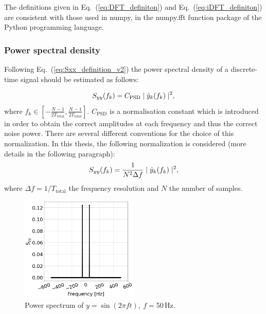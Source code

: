 The definitions given in Eq.~(\ref{eq:DFT_definiton}) and Eq.~(\ref{eq:iDFT_definiton}) are consistent with those used in numpy, in the numpy.fft function \cite{numpy_fft} package of the Python programming language. 

\subsubsection*{Power spectral density} %
Following Eq.~(\ref{eq:Sxx_definition_v2}) the power spectral density of a discrete-time signal should be estimated as follows:

\begin{equation}\label{eq:Sxx_definition_discrete_not_normalised}
    S_{yy}(f_k) = C_\mathrm{PSD} \mid \hat{y}_k(f_k) \mid ^2,
\end{equation}
where $f_k \in \left[-\frac{N-1}{2T_\mathrm{total}},\frac{N-1}{2T_\mathrm{total}} \right]$. $C_\mathrm{PSD}$ is a normalisation constant which is introduced in order to obtain the correct amplitudes at each frequency and thus the correct noise power. There are several different conventions for the choice of this normalization. In this thesis, the following normalization is considered (more details in the following paragraph):
\begin{equation}\label{eq:Sxx_definition_discrete_normalized}
    S_{yy}(f_k) = \frac{1}{N^2 \Delta f} \mid \hat{y}_k(f_k) \mid ^2,
\end{equation}
where  $\Delta f = 1/T_\mathrm{total}$ the frequency resolution and $N$ the number of samples.
    
\begin{figure}[!ht]
    \centering         
    \includegraphics[width=0.5\textwidth]{./images/app_B/simple_signal_1freq_psd_example.png}
        \caption{Power spectrum of $y=\sin(2 \pi f t),\ f = $50\,Hz.}
        \label{fig:psd_example_two_sided}
\end{figure}

